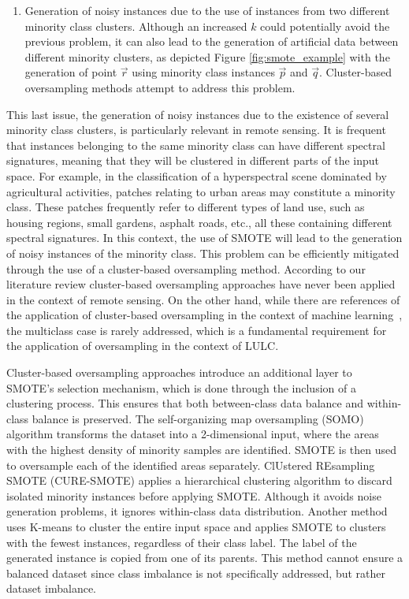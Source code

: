 \documentclass[information,article,submit,moreauthors,pdftex]{Definitions/mdpi}
\begin{document}
\begin{paracol}{2}
\begin{enumerate}
    \item Generation of noisy instances due to the use of
        instances from two different minority class clusters.
        Although an increased $k$ could potentially avoid the previous
        problem, it can also lead to the generation of artificial data between
        different minority clusters, as depicted Figure
        \ref{fig:smote_example} with the generation of point
        $\overrightarrow{r}$ using minority class instances $\overrightarrow{p}$ and $\overrightarrow{q}$.
        Cluster-based oversampling methods attempt to address this problem. 
\end{enumerate}

This last issue, the generation of noisy instances due to the existence of
several minority class clusters, is particularly relevant in remote sensing.
It is frequent that instances belonging to the same minority class can have
different spectral signatures, meaning that they will be clustered in
different parts of the input space. For example, in the classification of a
hyperspectral scene dominated by agricultural activities, patches relating to
urban areas may constitute a minority class. These patches frequently refer to
different types of land use, such as housing regions, small gardens, asphalt
roads, etc., all these containing different spectral signatures. In this
context, the use of SMOTE will lead to the generation of noisy instances of
the minority class. This problem can be efficiently mitigated through the use
of a cluster-based oversampling method. According to our literature review
cluster-based oversampling approaches have never been applied in the context
of remote sensing. On the other hand, while there are references of the
application of cluster-based oversampling in the context of machine
learning~\citep{Santos2015, Douzas2017, Ma2017, Douzas2018}, the multiclass
case is rarely addressed, which is a fundamental requirement for the
application of oversampling in the context of LULC. 

Cluster-based oversampling approaches introduce an additional layer to SMOTE's
selection mechanism, which is done through the inclusion of a clustering
process. This ensures that both between-class data balance and
within-class balance is preserved. The
self-organizing map oversampling (SOMO) \citep{Douzas2017} algorithm transforms
the dataset into a 2-dimensional input, where the areas with the highest
density of minority samples are identified. SMOTE is then used to oversample
each of the identified areas separately. ClUstered REsampling SMOTE
(CURE-SMOTE) \citep{Ma2017} applies a hierarchical clustering
algorithm to discard isolated minority instances before applying SMOTE.
Although it avoids noise generation problems, it ignores within-class data
distribution. Another method \citep{Santos2015} uses K-means to cluster the
entire input space and applies SMOTE to clusters with the fewest
instances, regardless of their class label. The label of the
generated instance is copied from one of its parents.
This method cannot ensure a balanced dataset since class imbalance is not
specifically addressed, but rather dataset imbalance.


\end{paracol}
\end{document}
